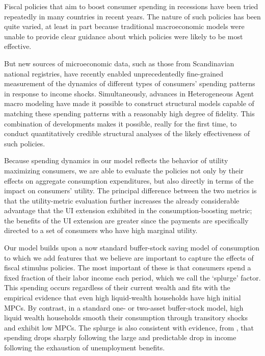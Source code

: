 \documentclass[../HAFiscal]{subfiles}
\begin{document}
Fiscal policies that aim to boost consumer spending in recessions have been tried repeatedly in many countries in recent years.  The nature of such policies has been quite varied, at least in part because traditional macroeconomic models were unable to provide clear guidance about which policies were likely to be most effective.

But new sources of microeconomic data, such as those from Scandinavian national registries, have recently enabled unprecedentedly fine-grained measurement of the dynamics of different types of consumers' spending patterns in response to income shocks.  Simultaneously, advances in Heterogeneous Agent macro modeling have made it possible to construct structural models capable of matching these spending patterns with a reasonably high degree of fidelity.  This combination of developments makes it possible, really for the first time, to conduct quantitatively credible structural analyses of the likely effectiveness of such policies.

Because spending dynamics in our model reflects the behavior of utility maximizing consumers, we are able to evaluate the policies not only by their effects on aggregate consumption expenditures, but also directly in terms of the impact on consumers' utility.  The principal difference between the two metrics is that the utility-metric evaluation further increases the already considerable advantage that the UI extension exhibited in the consumption-boosting metric; the benefits of the UI extension are greater since the payments are specifically directed to a set of consumers who have high marginal utility.

Our model builds upon a now standard buffer-stock saving model of consumption to which we add features that we believe are important to capture the effects of fiscal stimulus policies. The most important of these is that consumers spend a fixed fraction of their labor income each period, which we call the `splurge' factor. This spending occurs regardless of their current wealth and fits with the empirical evidence that even high liquid-wealth households have high initial MPCs. By contrast, in a standard one- or two-asset buffer-stock model, high liquid wealth households smooth their consumption through transitory shocks and exhibit low MPCs. The splurge is also consistent with evidence, from \cite{ganongConsumer2019}, that spending drops sharply following the large and predictable drop in income following the exhaustion of unemployment benefits. 
\end{document}
